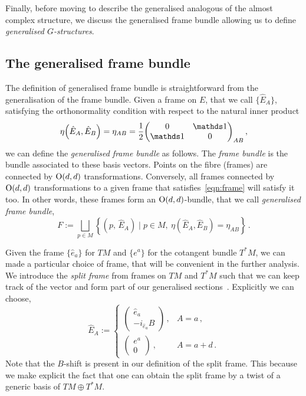 \documentclass[debug]{phd}
\begin{document}
					Finally, before moving to describe the generalised analogous of the almost complex structure, we discuss the generalised frame bundle allowing us to define \emph{generalised $G$-structures}.
					\subsection{The generalised frame bundle}\label{genframOdd}
						The definition of generalised frame bundle is straightforward from the generalisation of the frame bundle. 
						Given a frame on $E$, that we call $\{\hat{E}_A\}$, satisfying the orthonormality condition with respect to the natural inner product
								\begin{equation}\label{eqn:frame}
									\eta\left(\hat{E}_A, \hat{E}_B\right) = \eta_{AB} = \frac{1}{2} \begin{pmatrix} 0 & \id \\ 
																					\id & 0 \end{pmatrix}_{AB} \, ,
								\end{equation}
						we can define the \emph{generalised frame bundle} as follows. 
						The \emph{frame bundle} is the bundle associated to these basis vectors. 
						Points on the fibre (frames) are connected by $\mathrm{O}(d,d)$ transformations. 
						Conversely, all frames connected by $\mathrm{O}(d,d)$ transformations to a given frame that satisfies~\eqref{eqn:frame} will satisfy it too. 
						In other words, these frames form an $\mathrm{O}(d,d)$-bundle, that we call \emph{generalised frame bundle},
								\begin{equation}\label{genfr}
									F := \bigsqcup_{p\in M} \left\{\left( p,\, \hat{E}_A \right) \mid p \in M,\ \eta\left(\hat{E}_A, \hat{E}_B\right) = \eta_{AB} \right\} \, .
								\end{equation}

						Given the frame $\{\hat{e}_a\}$ for $TM$ and $\{e^a\}$ for the cotangent bundle $T^*M$, we can made a particular choice of frame, that will be convenient in the further analysis. 
						We introduce the \emph{split frame} from frames on $TM$ and $T^*M$ such that we can keep track of the vector and form part of our generalised sections~\cite{waldram1, waldram3}. 
						Explicitly we can choose,
								\begin{equation}\label{splitframe}
									\hat{E}_A := \begin{cases}
												\begin{pmatrix}\hat{e}_a\\ - i_{\hat{e}_a}B\end{pmatrix} \, , & A = a \, ,\\[3mm]
												\begin{pmatrix} e^a \\ 0 \end{pmatrix} \ , & A = a + d \, . \end{cases}
								\end{equation} 
						Note that the $B$-shift is present in our definition of the split frame. 
						This because we make explicit the fact that one can obtain the split frame by a twist of a generic basis of $TM \oplus T^*M$.
						
\end{document}
